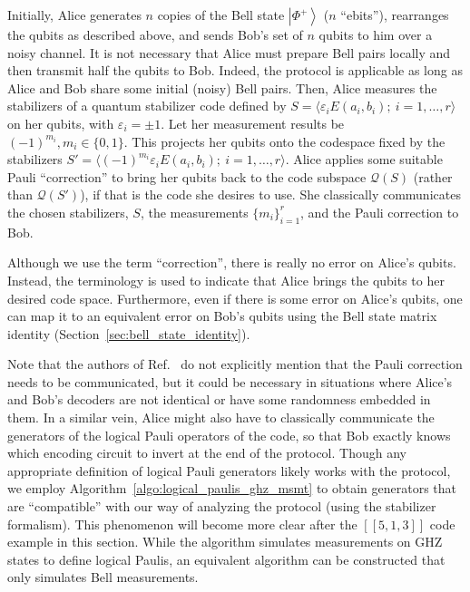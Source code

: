 \documentclass[journal,onecolumn]{IEEEtran}
\newcommand{\dket}[1]{\left\lvert #1 \right\rangle}
\newcommand{\llbr}{[\![}
\newcommand{\rrbr}{]\!]}
\begin{document}
Initially, Alice generates $n$ copies of the Bell state $\dket{\Phi^+}$ ($n$ ``ebits''), rearranges the qubits as described above, and sends Bob's set of $n$ qubits to him over a noisy channel. 
It is not necessary that Alice must prepare Bell pairs locally and then transmit half the qubits to Bob. 
Indeed, the protocol is applicable as long as Alice and Bob share some initial (noisy) Bell pairs.
Then, Alice measures the stabilizers of a quantum stabilizer code defined by $S = \langle \varepsilon_i E(a_i,b_i); \ i = 1,\ldots,r \rangle$ on her qubits, with $\varepsilon_i = \pm 1$.
Let her measurement results be $(-1)^{m_i}, m_i \in \{0,1\}$.
This projects her qubits onto the codespace fixed by the stabilizers $S' = \langle (-1)^{m_i} \varepsilon_i E(a_i,b_i); \ i = 1,\ldots,r \rangle$. 
Alice applies some suitable Pauli ``correction'' to bring her qubits back to the code subspace $\mathcal{Q}(S)$ (rather than $\mathcal{Q}(S')$), if that is the code she desires to use.
She classically communicates the chosen stabilizers, $S$, the measurements $\{ m_i \}_{i=1}^r$, and the Pauli correction to Bob.

Although we use the term ``correction'', there is really no error on Alice's qubits.
Instead, the terminology is used to indicate that Alice brings the qubits to her desired code space.
Furthermore, even if there is some error on Alice's qubits, one can map it to an equivalent error on Bob's qubits using the Bell state matrix identity (Section~\ref{sec:bell_state_identity}).

Note that the authors of Ref.~\cite{Wilde-isit10} do not explicitly mention that the Pauli correction needs to be communicated, but it could be necessary in situations where Alice's and Bob's decoders are not identical or have some randomness embedded in them.
In a similar vein, Alice might also have to classically communicate the generators of the logical Pauli operators of the code, so that Bob exactly knows which encoding circuit to invert at the end of the protocol.
Though any appropriate definition of logical Pauli generators likely works with the protocol, we employ Algorithm~\ref{algo:logical_paulis_ghz_msmt} to obtain generators that are ``compatible'' with our way of analyzing the protocol (using the stabilizer formalism).
This phenomenon will become more clear after the $\llbr 5,1,3 \rrbr$ code example in this section.
While the algorithm simulates measurements on GHZ states to define logical Paulis, an equivalent algorithm can be constructed that only simulates Bell measurements.
\end{document}
